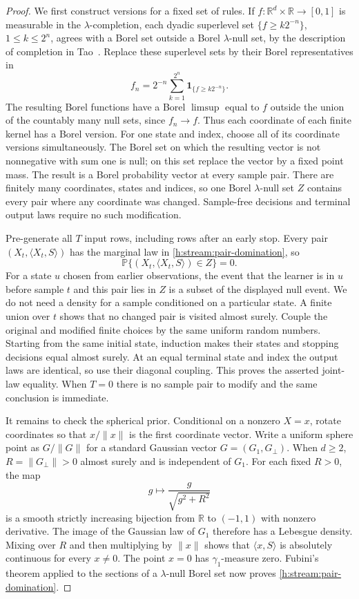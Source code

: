 \begin{proof}
We first construct versions for a fixed set of rules. If
$f:\mathbb R^d\times\mathbb R\to[0,1]$ is measurable in the
$\lambda$-completion, each dyadic superlevel set
$\{f\ge k2^{-n}\}$, $1\le k\le2^n$, agrees with a Borel set outside
a Borel $\lambda$-null set, by the description of completion in
Tao~\cite[Exercise~1.4.26]{TaoMeasure2011}. Replace these superlevel sets by their
Borel representatives in
\[
 f_n=2^{-n}\sum_{k=1}^{2^n}\mathbf 1_{\{f\ge k2^{-n}\}}.
\]
The resulting Borel functions have a Borel $\limsup$ equal to $f$
outside the union of the countably many null sets, since $f_n\to f$.
Thus each coordinate of each finite kernel has a Borel version.
For one state and index, choose all of its coordinate versions
simultaneously. The Borel set on which the resulting vector is not
nonnegative with sum one is null; on this set replace the vector by a
fixed point mass. The result is a Borel probability vector at every
sample pair. There are finitely many coordinates, states and indices,
so one Borel $\lambda$-null set $Z$ contains every pair where any
coordinate was changed. Sample-free decisions and terminal output
laws require no such modification.

Pre-generate all $T$ input rows, including rows after an early stop.
Every pair $(X_t,\langle X_t,S\rangle)$ has the marginal law in
\eqref{h:stream:pair-domination}, so
\[
 \mathbb P\{(X_t,\langle X_t,S\rangle)\in Z\}=0.
\]
For a state $u$ chosen from earlier observations, the event that the
learner is in $u$ before sample $t$ and this pair lies in $Z$ is a
subset of the displayed null event. We do not need a density for a
sample conditioned on a particular state. A finite union over $t$
shows that no changed pair is visited almost surely. Couple the
original and modified finite choices by the same uniform random
numbers. Starting from the same initial state, induction makes their
states and stopping decisions equal almost surely. At an equal
terminal state and index the output laws are identical, so use their
diagonal coupling. This proves the asserted joint-law equality. When
$T=0$ there is no sample pair to modify and the same conclusion is
immediate.

It remains to check the spherical prior. Conditional on a nonzero
$X=x$, rotate coordinates so that $x/\|x\|$ is the first coordinate
vector. Write a uniform sphere point as $G/\|G\|$ for a standard
Gaussian vector $G=(G_1,G_\perp)$. When $d\ge2$,
$R=\|G_\perp\|>0$ almost surely and is independent of $G_1$.
For each fixed $R>0$, the map
\[
 g\longmapsto \frac{g}{\sqrt{g^2+R^2}}
\]
is a smooth strictly increasing bijection from $\mathbb R$ to
$(-1,1)$ with nonzero derivative. The image of the Gaussian law of
$G_1$ therefore has a Lebesgue density. Mixing over $R$ and then
multiplying by $\|x\|$ shows that $\langle x,S\rangle$ is absolutely
continuous for every $x\ne0$. The point $x=0$ has $\gamma_1$-measure
zero. Fubini's theorem applied to the sections of a
$\lambda$-null Borel set now proves
\eqref{h:stream:pair-domination}.
\end{proof}

